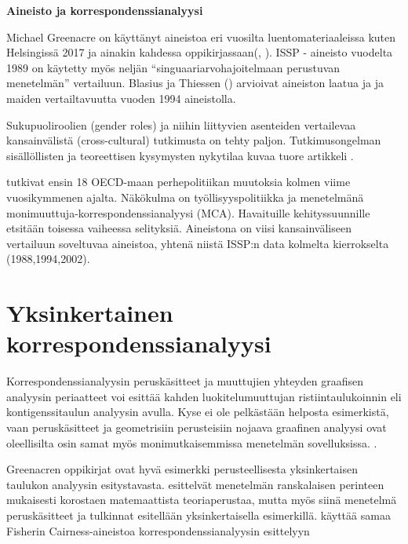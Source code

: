 \documentclass[
  finnish,
]{book}
\begin{document}
\textbf{Aineisto ja korrespondenssianalyysi}

Michael Greenacre on käyttänyt aineistoa eri vuosilta luentomateriaaleissa kuten
Helsingissä 2017\citep{RefWorks:doc:5b6ef091e4b0984fd9b8c0ca} ja ainakin kahdessa
oppikirjassaan(\citep{RefWorks:doc:5a857a43e4b0ed2d44664d7c},
\citep{RefWorks:doc:5a857a43e4b0ed2d44664d78}).
ISSP - aineisto vuodelta 1989 on käytetty myös neljän ``singuaariarvohajoitelmaan
perustuvan menetelmän'' vertailuun\citep{RefWorks:doc:5b6f159ce4b0bc0f31734b76}. Blasius
ja Thiessen (\citep{RefWorks:doc:5b15542ee4b0e2616bc42dca}) arvioivat aineiston laatua
ja ja maiden vertailtavuutta vuoden 1994 aineistolla.

Sukupuoliroolien (gender roles) ja niihin liittyvien asenteiden vertailevaa
kansainvälistä (cross-cultural) tutkimusta on tehty paljon. Tutkimusongelman
sisällöllisten ja teoreettisen kysymysten nykytilaa kuvaa tuore artikkeli
\citep{RefWorks:doc:5bd08fb6e4b05c5447c9a9f9}.

\citet{RefWorks:doc:5bd0a663e4b0c91dcf7c4be9} tutkivat ensin 18
OECD-maan perhepolitiikan muutoksia kolmen viime vuosikymmenen ajalta. Näkökulma on
työllisyyspolitiikka ja menetelmänä monimuuttuja-korrespondenssianalyysi (MCA).
Havaituille kehityssuunnille etsitään toisessa vaiheessa selityksiä. Aineistona
on viisi kansainväliseen vertailuun soveltuvaa aineistoa, yhtenä niistä ISSP:n
data kolmelta kierrokselta (1988,1994,2002).

\hypertarget{yksinkertainen-korrespondenssianalyysi}{%
\chapter{Yksinkertainen korrespondenssianalyysi}\label{yksinkertainen-korrespondenssianalyysi}}

Korrespondenssianalyysin peruskäsitteet ja muuttujien yhteyden graafisen analyysin
periaatteet voi esittää kahden luokitelumuuttujan ristiintaulukoinnin eli
kontigenssitaulun analyysin avulla. Kyse ei ole pelkästään helposta esimerkistä,
vaan peruskäsitteet ja geometrisiin perusteisiin nojaava graafinen analyysi ovat
oleellisilta osin samat myös monimutkaisemmissa menetelmän sovelluksissa. \citep{RefWorks:doc:5a857a44e4b0ed2d44664d84}.

Greenacren oppikirjat ovat hyvä esimerkki
perusteellisesta yksinkertaisen taulukon analyysin esitystavasta.
\citet{RefWorks:doc:5a857a43e4b0ed2d44664d75} esittelvät menetelmän
ranskalaisen perinteen mukaisesti korostaen matemaattista teoriaperustaa,
mutta myös siinä menetelmä peruskäsitteet ja tulkinnat esitellään yksinkertaisella
esimerkillä. \citet{RefWorks:doc:5a857a44e4b0ed2d44664d95} käyttää samaa Fisherin
Cairness-aineistoa korrespondenssianalyysin esittelyyn
\end{document}
